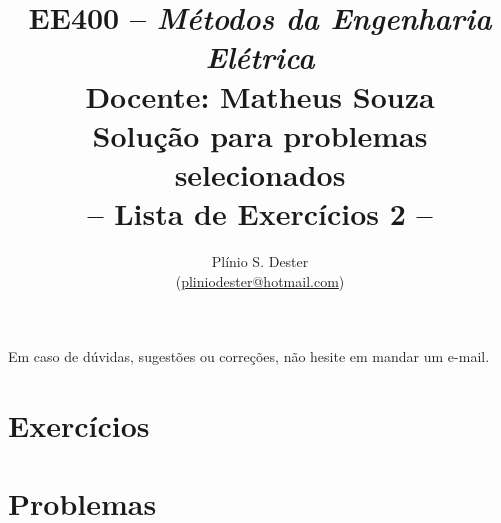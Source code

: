 \documentclass[answers, 12pt]{exam}
\title{	%
        EE400 -- \textit{Métodos da Engenharia Elétrica} \\[-0mm]
        {\Large Docente: Matheus Souza} \\[+1mm]
        {\Large Solução para problemas selecionados}\\[-0mm]
        -- Lista de Exercícios 2 --
}
\author{Plínio S. Dester\\ (\url{pliniodester@hotmail.com})}
\begin{document}
\maketitle

Em caso de dúvidas, sugestões ou correções, não hesite em mandar um e-mail.


\setcounter{section}{1}
\section{Exercícios}


\setcounter{section}{1}
\section{Problemas}


% 
\end{document}

